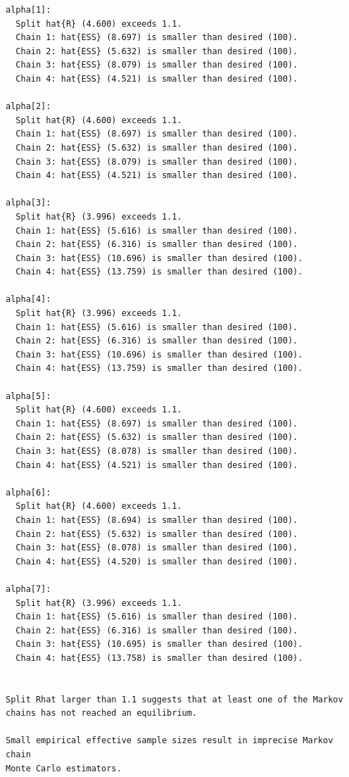 \documentclass[
  letterpaper,
  DIV=11,
  numbers=noendperiod]{scrartcl}
\begin{document}
\begin{verbatim}
alpha[1]:
  Split hat{R} (4.600) exceeds 1.1.
  Chain 1: hat{ESS} (8.697) is smaller than desired (100).
  Chain 2: hat{ESS} (5.632) is smaller than desired (100).
  Chain 3: hat{ESS} (8.079) is smaller than desired (100).
  Chain 4: hat{ESS} (4.521) is smaller than desired (100).

alpha[2]:
  Split hat{R} (4.600) exceeds 1.1.
  Chain 1: hat{ESS} (8.697) is smaller than desired (100).
  Chain 2: hat{ESS} (5.632) is smaller than desired (100).
  Chain 3: hat{ESS} (8.079) is smaller than desired (100).
  Chain 4: hat{ESS} (4.521) is smaller than desired (100).

alpha[3]:
  Split hat{R} (3.996) exceeds 1.1.
  Chain 1: hat{ESS} (5.616) is smaller than desired (100).
  Chain 2: hat{ESS} (6.316) is smaller than desired (100).
  Chain 3: hat{ESS} (10.696) is smaller than desired (100).
  Chain 4: hat{ESS} (13.759) is smaller than desired (100).

alpha[4]:
  Split hat{R} (3.996) exceeds 1.1.
  Chain 1: hat{ESS} (5.616) is smaller than desired (100).
  Chain 2: hat{ESS} (6.316) is smaller than desired (100).
  Chain 3: hat{ESS} (10.696) is smaller than desired (100).
  Chain 4: hat{ESS} (13.759) is smaller than desired (100).

alpha[5]:
  Split hat{R} (4.600) exceeds 1.1.
  Chain 1: hat{ESS} (8.697) is smaller than desired (100).
  Chain 2: hat{ESS} (5.632) is smaller than desired (100).
  Chain 3: hat{ESS} (8.078) is smaller than desired (100).
  Chain 4: hat{ESS} (4.521) is smaller than desired (100).

alpha[6]:
  Split hat{R} (4.600) exceeds 1.1.
  Chain 1: hat{ESS} (8.694) is smaller than desired (100).
  Chain 2: hat{ESS} (5.632) is smaller than desired (100).
  Chain 3: hat{ESS} (8.078) is smaller than desired (100).
  Chain 4: hat{ESS} (4.520) is smaller than desired (100).

alpha[7]:
  Split hat{R} (3.996) exceeds 1.1.
  Chain 1: hat{ESS} (5.616) is smaller than desired (100).
  Chain 2: hat{ESS} (6.316) is smaller than desired (100).
  Chain 3: hat{ESS} (10.695) is smaller than desired (100).
  Chain 4: hat{ESS} (13.758) is smaller than desired (100).


Split Rhat larger than 1.1 suggests that at least one of the Markov
chains has not reached an equilibrium.

Small empirical effective sample sizes result in imprecise Markov chain
Monte Carlo estimators.
\end{verbatim}
\end{document}
